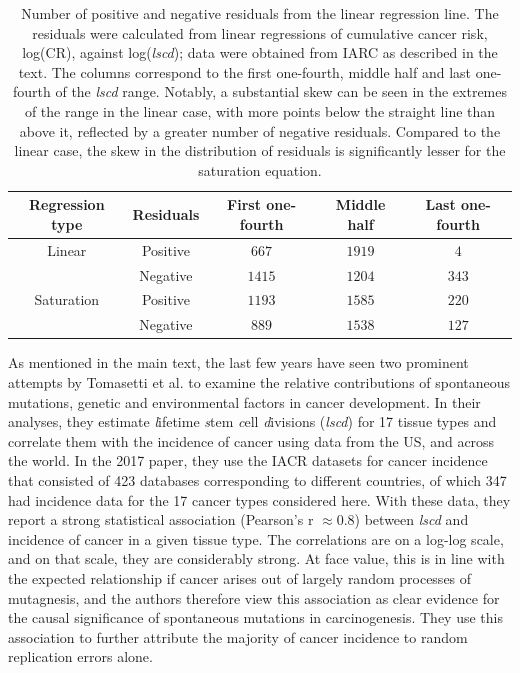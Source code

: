 \documentclass[10pt,twocolumn,twoside]{article}
\begin{document}
		\begin{table}[tbhp]
			\centering
			\begin{tabular}[c]{ccccc}
				\textbf{Regression type} & \textbf{Residuals} & \textbf{First one-fourth} & \textbf{Middle half} & \textbf{Last one-fourth} \\
				\hline
				Linear & Positive & $667$ & $1919$ & $4$ \\
			  	& Negative & $1415$ & $1204$ & $343$ \\
				Saturation & Positive & $1193$ & $1585$ & $220$ \\
			 	& Negative & $889$ & $1538$ & $127$ \\
			 	\hline
			\end{tabular}
			\caption{Number of positive and negative residuals from the linear regression line. The residuals were calculated from linear regressions of cumulative cancer risk, log(CR), against log(\textit{lscd}); data were obtained from IARC as described in the text. The columns correspond to the first one-fourth, middle half and last one-fourth of the \textit{lscd} range. Notably, a substantial skew can be seen in the extremes of the range in the linear case, with more points below the straight line than above it, reflected by a greater number of negative residuals. Compared to the linear case, the skew in the distribution of residuals is significantly lesser for the saturation equation.}
			\label{Table S3.2}
		\end{table}

		As mentioned in the main text, the last few years have seen two prominent attempts by Tomasetti et al. to examine the relative contributions of spontaneous mutations, genetic and environmental factors in cancer development.  In their analyses, they estimate \textit{l}ifetime \textit{s}tem \textit{c}ell \textit{d}ivisions (\textit{lscd}) for 17 tissue types and correlate them with the incidence of cancer using data from the US, and across the world. In the 2017 paper, they use the IACR datasets for cancer incidence that consisted of 423 databases corresponding to different countries, of which 347 had incidence data for the 17 cancer types considered here. With these data, they report a strong statistical association (Pearson’s r $\approx 0.8$) between \textit{lscd} and incidence of cancer in a given tissue type. The correlations are on a log-log scale, and on that scale, they are considerably strong. At face value, this is in line with the expected relationship if cancer arises out of largely random processes of mutagnesis, and the authors therefore view this association as clear evidence for the causal significance of spontaneous mutations in carcinogenesis. They use this association to further attribute the majority of cancer incidence to random replication errors alone.
\end{document}
